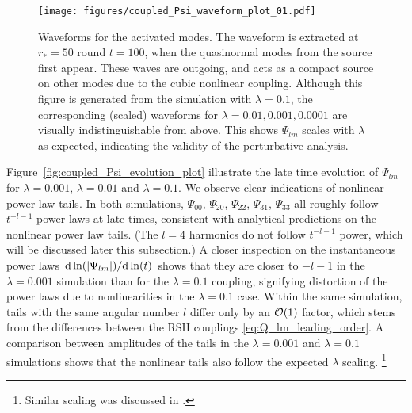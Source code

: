 \documentclass[reprint,aps,physrev,superscriptaddress,10pt,notitlepage,prd,nofootinbib,onecolumn]{revtex4-2}
\newcommand{\Fref}[1]{Figure~\ref{#1}}
\begin{document}
\begin{figure}[t]
  \centering \texttt{[image: figures/coupled\_Psi\_waveform\_plot\_01.pdf]}
  \caption{Waveforms for the activated modes.
    The waveform is extracted at $r_*=50$ round $t=100$, when the quasinormal modes from the source first appear.
    These waves are outgoing, and acts as a compact source on other modes due to the cubic nonlinear coupling.
    Although this figure is generated from the simulation with $\lambda = 0.1$, the corresponding (scaled) waveforms for $\lambda = 0.01, 0.001, 0.0001$ are visually indistinguishable from above.
    This shows $\Psi_{lm}$ scales with $\lambda$ as expected, indicating the validity of the perturbative analysis.}
  \label{fig:coupled_Psi_waveform_plot}
\end{figure}

\Fref{fig:coupled_Psi_evolution_plot} illustrate the late time evolution of $\Psi_{lm}$ for $\lambda = 0.001$, $\lambda = 0.01$ and $\lambda = 0.1$.
We observe clear indications of nonlinear power law tails.
In both simulations, $\Psi_{00}$, $\Psi_{20}$, $\Psi_{22}$, $\Psi_{31}$, $\Psi_{33}$ all roughly follow $t^{-l-1}$ power laws at late times, consistent with analytical predictions on the nonlinear power law tails.
(The $l=4$ harmonics do not follow $t^{-l-1}$ power, which will be discussed later this subsection.)
A closer inspection on the instantaneous power laws $\dv*{\ln(|\Psi_{lm}|)}{\ln(t)}$ shows that they are closer to $-l-1$ in the $\lambda = 0.001$ simulation than for the $\lambda = 0.1$ coupling, signifying distortion of the power laws due to nonlinearities in the $\lambda = 0.1$ case.
Within the same simulation, tails with the same angular number $l$ differ only by an $\order{1}$ factor, which stems from the differences between the RSH couplings \eqref{eq:Q_lm_leading_order}.
A comparison between amplitudes of the tails in the $\lambda = 0.001$ and $\lambda = 0.1$ simulations shows that the nonlinear tails also follow the expected $\lambda$ scaling.
\footnote{Similar scaling was discussed in \cite{Zlochower:2003yh}.}
\end{document}
